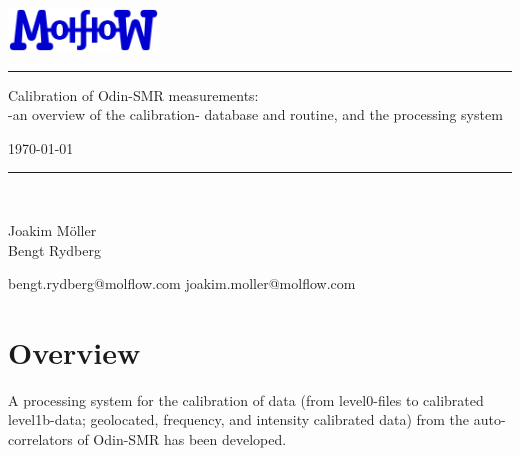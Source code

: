 \documentclass[12pt]{article}
\begin{document}
\fancyhead[CE,CO]{}
\fancyhead[RE,RO]{}
\fancyfoot[LO,LE]{}
\fancyfoot[RO,RE]{}
\fancyfoot[CO,CE]{\thepage}
\renewcommand{\footrulewidth}{0.4pt}
\renewcommand{\headrulewidth}{0.4pt}


\begin{titlepage}
	    \includegraphics[width=0.3\textwidth]{molflow.png}
  \begin{flushright}
    \noindent\rule{\textwidth}{2pt}
    \vspace{1cm}
    \begin{large}
	   Calibration of Odin-SMR measurements:\\
           -an overview of the calibration- database and
            routine, and the processing system\\
    \end{large}
      \vspace{1cm}
    \today\\
    \noindent\rule{\textwidth}{2pt}
    \vspace{1cm}\\
    \begin{minipage}[t]{0.3\textwidth}
    \end{minipage}%
    \begin{minipage}[t]{0.30\textwidth}
	Joakim M\"{o}ller\\
        Bengt Rydberg
    \end{minipage}%
    \begin{minipage}[t]{0.4\textwidth}
      \begin{flushright}
        bengt.rydberg@molflow.com
        joakim.moller@molflow.com
      \end{flushright}
\end{minipage}
  \vspace{8cm}
\end{flushright}
\end{titlepage}

\tableofcontents
\thispagestyle{empty}
\newpage
\setcounter{page}{1}
\section{Overview}
A processing system for the calibration of data 
(from level0-files to calibrated level1b-data;
geolocated, frequency, and intensity calibrated data)
from the auto-correlators of Odin-SMR has been developed.
\end{document}
